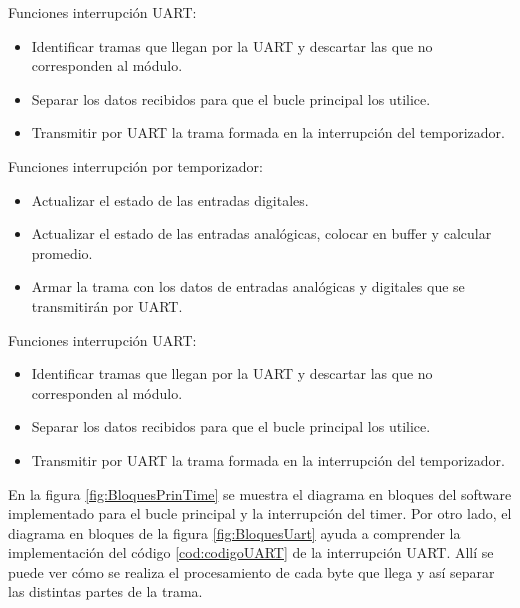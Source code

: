 Funciones interrupción UART:
\begin{itemize}
	\item Identificar tramas que llegan por la UART y descartar las que no corresponden al módulo.
	\item Separar los datos recibidos para que el bucle principal los utilice.
	\item Transmitir por UART la trama formada en la interrupción del temporizador.
\end{itemize}


Funciones interrupción por temporizador:
\begin{itemize}
	\item Actualizar el estado de las entradas digitales.
	\item Actualizar el estado de las entradas analógicas, colocar en buffer y calcular promedio.
	\item Armar la trama con los datos de entradas analógicas y digitales que se transmitirán por UART.
\end{itemize}

Funciones interrupción UART:
\begin{itemize}
	\item Identificar tramas que llegan por la UART y descartar las que no corresponden al módulo.
	\item Separar los datos recibidos para que el bucle principal los utilice.
	\item Transmitir por UART la trama formada en la interrupción del temporizador.
\end{itemize}

En la figura \ref{fig:BloquesPrinTime} se muestra el diagrama en bloques del software implementado para el bucle principal y la interrupción del timer. Por otro lado, el diagrama en bloques de la figura \ref{fig:BloquesUart} ayuda a comprender la implementación del código \ref{cod:codigoUART} de la interrupción UART. Allí se puede ver cómo se realiza el procesamiento de cada byte que llega y así separar las distintas partes de la trama.


